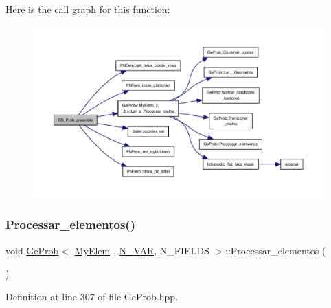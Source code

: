 Here is the call graph for this function\+:
\nopagebreak
\begin{figure}[H]
\begin{center}
\leavevmode
\includegraphics[width=350pt]{classED__Prob_a2530abb5eba122a90a2bae601893ddfc_cgraph}
\end{center}
\end{figure}
\mbox{\label{classGeProb_abe608186b9102498672c115584169d9a}} 
\subsubsection{\texorpdfstring{Processar\+\_\+elementos()}{Processar\_elementos()}}
{\footnotesize\ttfamily void \hyperlink{classGeProb}{Ge\+Prob}$<$ \hyperlink{DG__Prob_8h_a83cd887ced9a6587428f267e50cd4787}{My\+Elem} , \hyperlink{classED__Prob_a4e7d2ff1a8e435e336fb00c527224b5a}{N\+\_\+\+V\+AR}, N\+\_\+\+F\+I\+E\+L\+DS $>$\+::Processar\+\_\+elementos (\begin{DoxyParamCaption}{ }\end{DoxyParamCaption})\hspace{0.3cm}{\ttfamily [inherited]}}



Definition at line 307 of file Ge\+Prob.\+hpp.



